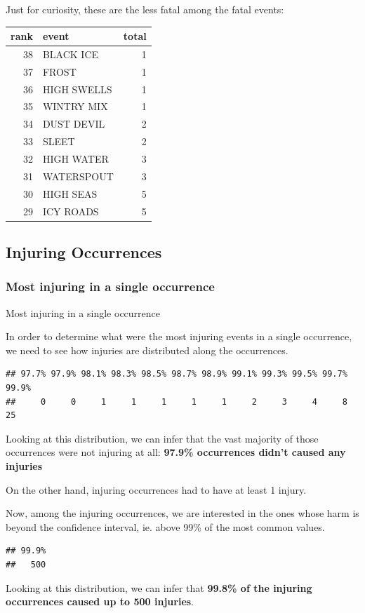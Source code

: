 \documentclass[]{article}
\begin{document}
Just for curiosity, these are the less fatal among the fatal events:

\begin{longtable}[]{@{}rlr@{}}
\toprule
rank & event & total\tabularnewline
\midrule
\endhead
38 & BLACK ICE & 1\tabularnewline
37 & FROST & 1\tabularnewline
36 & HIGH SWELLS & 1\tabularnewline
35 & WINTRY MIX & 1\tabularnewline
34 & DUST DEVIL & 2\tabularnewline
33 & SLEET & 2\tabularnewline
32 & HIGH WATER & 3\tabularnewline
31 & WATERSPOUT & 3\tabularnewline
30 & HIGH SEAS & 5\tabularnewline
29 & ICY ROADS & 5\tabularnewline
\bottomrule
\end{longtable}

\subsection{Injuring Occurrences}\label{injuring-occurrences}

\subsubsection{Most injuring in a single
occurrence}\label{most-injuring-in-a-single-occurrence}

Most injuring in a single occurrence

In order to determine what were the most injuring events in a single
occurrence, we need to see how injuries are distributed along the
occurrences.

\begin{verbatim}
## 97.7% 97.9% 98.1% 98.3% 98.5% 98.7% 98.9% 99.1% 99.3% 99.5% 99.7% 99.9% 
##     0     0     1     1     1     1     1     2     3     4     8    25
\end{verbatim}

Looking at this distribution, we can infer that the vast majority of
those occurrences were not injuring at all: \textbf{97.9\% occurrences
didn't caused any injuries}

On the other hand, injuring occurrences had to have at least 1 injury.

Now, among the injuring occurrences, we are interested in the ones whose
harm is beyond the confidence interval, ie. above 99\% of the most
common values.

\begin{verbatim}
## 99.9% 
##   500
\end{verbatim}

Looking at this distribution, we can infer that \textbf{99.8\% of the
injuring occurrences caused up to 500 injuries}.
\end{document}
